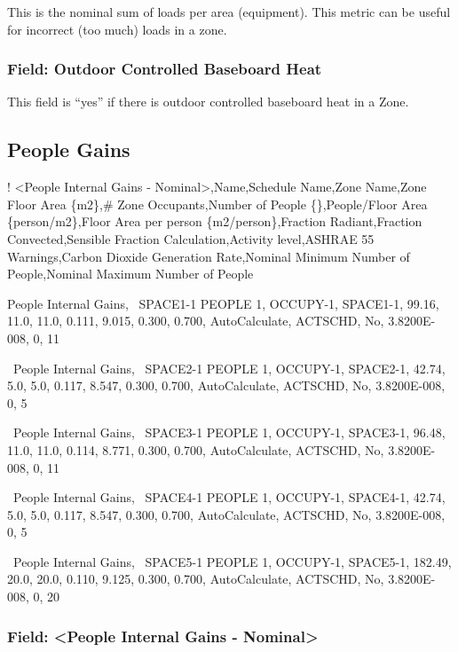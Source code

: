 This is the nominal sum of loads per area (equipment). This metric can be useful for incorrect (too much) loads in a zone.

\subsubsection{Field: Outdoor Controlled Baseboard Heat}\label{field-outdoor-controlled-baseboard-heat}

This field is ``yes'' if there is outdoor controlled baseboard heat in a Zone.

\subsection{People Gains}\label{people-gains}

! \textless{}People Internal Gains - Nominal\textgreater{},Name,Schedule Name,Zone Name,Zone Floor Area \{m2\},\# Zone Occupants,Number of People \{\},People/Floor Area \{person/m2\},Floor Area per person \{m2/person\},Fraction Radiant,Fraction Convected,Sensible Fraction Calculation,Activity level,ASHRAE 55 Warnings,Carbon Dioxide Generation Rate,Nominal Minimum Number of People,Nominal Maximum Number of People

People Internal Gains,~ SPACE1-1 PEOPLE 1, OCCUPY-1, SPACE1-1, 99.16, 11.0, 11.0, 0.111, 9.015, 0.300, 0.700, AutoCalculate, ACTSCHD, No, 3.8200E-008, 0, 11

~People Internal Gains,~ SPACE2-1 PEOPLE 1, OCCUPY-1, SPACE2-1, 42.74, 5.0, 5.0, 0.117, 8.547, 0.300, 0.700, AutoCalculate, ACTSCHD, No, 3.8200E-008, 0, 5

~People Internal Gains,~ SPACE3-1 PEOPLE 1, OCCUPY-1, SPACE3-1, 96.48, 11.0, 11.0, 0.114, 8.771, 0.300, 0.700, AutoCalculate, ACTSCHD, No, 3.8200E-008, 0, 11

~People Internal Gains,~ SPACE4-1 PEOPLE 1, OCCUPY-1, SPACE4-1, 42.74, 5.0, 5.0, 0.117, 8.547, 0.300, 0.700, AutoCalculate, ACTSCHD, No, 3.8200E-008, 0, 5

~People Internal Gains,~ SPACE5-1 PEOPLE 1, OCCUPY-1, SPACE5-1, 182.49, 20.0, 20.0, 0.110, 9.125, 0.300, 0.700, AutoCalculate, ACTSCHD, No, 3.8200E-008, 0, 20

\subsubsection{Field: \textless{}People Internal Gains - Nominal\textgreater{}}\label{field-people-internal-gains---nominal}

